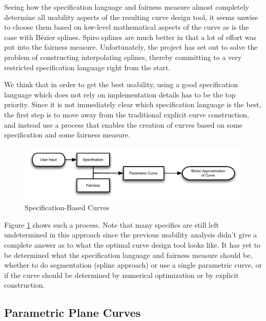 \documentclass[a4paper]{article}
\begin{document}
			Seeing how the specification language and fairness measure almost completely determine all usability aspects of the resulting curve design tool, it seems unwise to choose them based on low-level mathematical aspects of the curve as is the case with Bézier splines. Spiro splines are much better in that a lot of effort was put into the fairness measure. Unfortunately, the project has set out to solve the problem of constructing interpolating splines, thereby committing to a very restricted specification language right from the start.

			We think that in order to get the best usability, using a good specification language which does not rely on implementation details has to be the top priority. Since it is not immediately clear which specification language is the best, the first step is to move away from the traditional explicit curve construction, and instead use a process that enables the creation of curves based on some specification and some fairness measure.

			\begin{figure}[htb]
				\centering
				\includegraphics[width=\textwidth]{../resources/specification-based_curves.pdf}
				\caption{Specification-Based Curves}
				\label{figure:specification-based_curves}
			\end{figure}

			Figure \ref{figure:specification-based_curves} shows such a process. Note that many specifics are still left undetermined in this approach since the previous usability analysis didn't give a complete answer as to what the optimal curve design tool looks like. It has yet to be determined what the specification language and fairness measure should be, whether to do segmentation (spline approach) or use a single parametric curve, or if the curve should be determined by numerical optimization or by explicit construction.

		\subsection{Parametric Plane Curves}
		\label{section:parametric_plane_curves}
\end{document}
